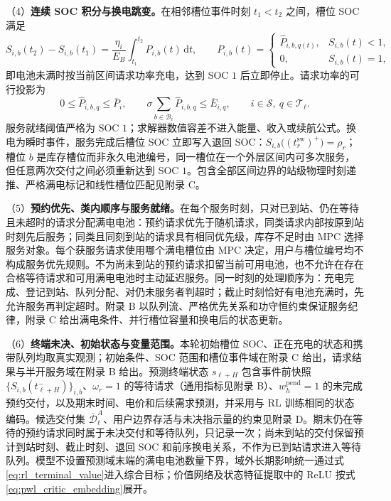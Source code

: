 \documentclass[12pt,a4paper,UTF8]{ctexart}
\begin{document}
（4）\textbf{连续 SOC 积分与换电跳变。}在相邻槽位事件时刻 $t_1<t_2$ 之间，槽位 SOC 满足
\begin{equation}
S_{i,b}(t_2)-S_{i,b}(t_1)
=
\frac{\eta_i}{E_B}
\int_{t_1}^{t_2}P_{i,b}(t)\,\mathrm dt,
\qquad
P_{i,b}(t)=
\begin{cases}
\widehat P_{i,b,q(t)},&S_{i,b}(t)<1,\\
0,&S_{i,b}(t)=1,
\end{cases}
\label{eq:event_charging_transition}
\end{equation}
即电池未满时按当前区间请求功率充电，达到 SOC $1$ 后立即停止。请求功率的可行投影为
\begin{equation}
0\le \widehat P_{i,b,q}\le\overline P_i,
\qquad
\sigma\sum_{b\in\mathcal B_i}\widehat P_{i,b,q}
\le\overline E_{i,q},
\qquad i\in\mathcal S,\ q\in\mathcal T_\ell.
\label{eq:power_projection}
\end{equation}
服务就绪阈值严格为 SOC $1$；求解器数值容差不进入能量、收入或续航公式。换电为瞬时事件，服务完成后槽位 SOC 立即写入退回 SOC：$S_{i,b}\big((t_r^{\mathrm{sw}})^+\big)=\rho_r$；槽位 $b$ 是库存槽位而非永久电池编号，同一槽位在一个外层区间内可多次服务，但任意两次交付之间必须重新达到 SOC $1$。包含全部区间边界的站级物理时刻递推、严格满电标记和线性槽位匹配见附录 C。

（5）\textbf{预约优先、类内顺序与服务就绪。}在每个服务时刻，只对已到站、仍在等待且未超时的请求分配满电电池：预约请求优先于随机请求，同类请求内部按原到站时刻先后服务；同类且同刻到站的请求具有相同优先级，库存不足时由 MPC 选择服务对象。每个获服务请求使用哪个满电槽位由 MPC 决定，用户与槽位编号均不构成服务优先规则。不为尚未到站的预约请求扣留当前可用电池，也不允许在存在合格等待请求和可用满电电池时主动延迟服务。同一时刻的处理顺序为：充电完成、登记到站、队列分配、对仍未服务者判超时；截止时刻恰好有电池充满时，先允许服务再判定超时。附录 B 以队列流、严格优先关系和功守恒约束保证服务纪律，附录 C 给出满电条件、并行槽位容量和换电后的状态更新。

（6）\textbf{终端未决、初始状态与变量范围。}本轮初始槽位 SOC、正在充电的状态和携带队列均取真实观测；初始条件、SOC 范围和槽位事件域在附录 C 给出，请求结果与半开服务域在附录 B 给出。预测终端状态 $s_{\ell+H}$ 包含事件前快照 $\{S_{i,b}(t_{\ell+H}^{-})\}_{i,b}$、$\omega_r=1$ 的等待请求（通用指标见附录 B）、$w_h^{\mathrm{pend}}=1$ 的未完成预约交付，以及期末时间、电价和后续需求预测，并采用与 RL 训练相同的状态编码。候选交付集 $\overline{\mathcal D}_{\ell}^{A}$、用户边界存活与未决指示量的约束见附录 D。期末仍在等待的预约请求同时属于未决交付和等待队列，只记录一次；尚未到站的交付保留预计到站时刻、截止时刻、退回 SOC 和前序换电关系，不作为已到站请求进入等待队列。模型不设置预测域末端的满电电池数量下界，域外长期影响统一通过式\eqref{eq:rl_terminal_value}进入综合目标；价值网络及状态特征提取中的 ReLU 按式\eqref{eq:pwl_critic_embedding}展开。
\end{document}
